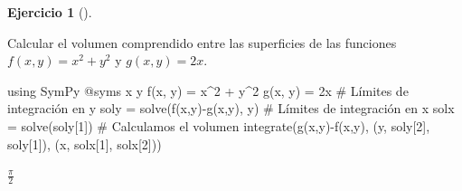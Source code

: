 \documentclass[
  a4paper,
]{scrreport}
\newenvironment{Shaded}{\begin{snugshade}}{\end{snugshade}}
\newcommand{\BuiltInTok}[1]{\textcolor[rgb]{0.00,0.23,0.31}{#1}}
\newcommand{\CommentTok}[1]{\textcolor[rgb]{0.37,0.37,0.37}{#1}}
\newcommand{\FloatTok}[1]{\textcolor[rgb]{0.68,0.00,0.00}{#1}}
\newcommand{\FunctionTok}[1]{\textcolor[rgb]{0.28,0.35,0.67}{#1}}
\newcommand{\ImportTok}[1]{\textcolor[rgb]{0.00,0.46,0.62}{#1}}
\newcommand{\NormalTok}[1]{\textcolor[rgb]{0.00,0.23,0.31}{#1}}
\newcommand{\OperatorTok}[1]{\textcolor[rgb]{0.37,0.37,0.37}{#1}}
\newcommand{\PreprocessorTok}[1]{\textcolor[rgb]{0.68,0.00,0.00}{#1}}
\theoremstyle{definition}
\newtheorem{exercise}{Ejercicio}[chapter]
\theoremstyle{remark}
\begin{document}
\begin{exercise}[]\protect\hypertarget{exr-volumen-entre-superficies}{}\label{exr-volumen-entre-superficies}

Calcular el volumen comprendido entre las superficies de las funciones
\(f(x,y)=x^2+y^2\) y \(g(x,y)=2x\).

\begin{tcolorbox}[enhanced jigsaw, opacitybacktitle=0.6, bottomrule=.15mm, opacityback=0, colback=white, left=2mm, coltitle=black, rightrule=.15mm, breakable, bottomtitle=1mm, leftrule=.75mm, title=\textcolor{quarto-callout-tip-color}{\faLightbulb}\hspace{0.5em}{Solución}, titlerule=0mm, toptitle=1mm, colbacktitle=quarto-callout-tip-color!10!white, colframe=quarto-callout-tip-color-frame, toprule=.15mm, arc=.35mm]

\begin{Shaded}
\begin{Highlighting}[]
\ImportTok{using} \BuiltInTok{SymPy}
\PreprocessorTok{@syms}\NormalTok{ x y}
\FunctionTok{f}\NormalTok{(x, y) }\OperatorTok{=}\NormalTok{ x}\OperatorTok{\^{}}\FloatTok{2} \OperatorTok{+}\NormalTok{ y}\OperatorTok{\^{}}\FloatTok{2}
\FunctionTok{g}\NormalTok{(x, y) }\OperatorTok{=} \FloatTok{2}\NormalTok{x}
\CommentTok{\# Límites de integración en y}
\NormalTok{soly }\OperatorTok{=} \FunctionTok{solve}\NormalTok{(}\FunctionTok{f}\NormalTok{(x,y)}\FunctionTok{{-}g}\NormalTok{(x,y), y)}
\CommentTok{\# Límites de integración en x}
\NormalTok{solx }\OperatorTok{=} \FunctionTok{solve}\NormalTok{(soly[}\FloatTok{1}\NormalTok{])}
\CommentTok{\# Calculamos el volumen}
\FunctionTok{integrate}\NormalTok{(}\FunctionTok{g}\NormalTok{(x,y)}\FunctionTok{{-}f}\NormalTok{(x,y), (y, soly[}\FloatTok{2}\NormalTok{], soly[}\FloatTok{1}\NormalTok{]), (x, solx[}\FloatTok{1}\NormalTok{], solx[}\FloatTok{2}\NormalTok{]))}
\end{Highlighting}
\end{Shaded}

$\frac{\pi}{2}$

\end{tcolorbox}

\end{exercise}
\end{document}
